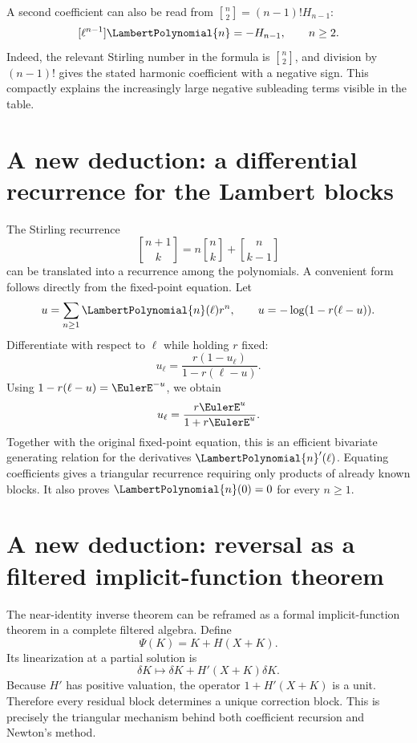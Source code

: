 \documentclass[11pt,openany]{book}
\theoremstyle{definition}
\theoremstyle{plain}
\theoremstyle{remark}
\newcommand{\stirlingone}[2]{\genfrac{[}{]}{0pt}{}{#1}{#2}}
\begin{document}
A second coefficient can also be read from \(\stirlingone{n}{2}=(n-1)!H_{n-1}\):
\begin{equation}\label{eq:Pn-next-leading}
 [\ell^{n-1}]\LambertPolynomial{n}
 =-H_{n-1},
 \qquad n\ge2.
\end{equation}
Indeed, the relevant Stirling number in the formula is \(\stirlingone{n}{2}\), and division by \((n-1)!\) gives the stated harmonic coefficient with a negative sign. This compactly explains the increasingly large negative subleading terms visible in the table.

\section{A new deduction: a differential recurrence for the Lambert blocks}
The Stirling recurrence
\[
 \stirlingone{n+1}{k}=n\stirlingone{n}{k}+\stirlingone{n}{k-1}
\]
can be translated into a recurrence among the polynomials. A convenient form follows directly from the fixed-point equation. Let
\[
 u=\sum_{n\ge1}\LambertPolynomial{n}(\ell)r^n,
 \qquad
 u=-\log(1-r(\ell-u)).
\]
Differentiate with respect to \(\ell\) while holding \(r\) fixed:
\[
 u_\ell=\frac{r(1-u_\ell)}{1-r(\ell-u)}.
\]
Using \(1-r(\ell-u)=\EulerE^{-u}\), we obtain
\begin{equation}\label{eq:Lambert-generating-differential}
 u_\ell=\frac{r\EulerE^u}{1+r\EulerE^u}.
\end{equation}
Together with the original fixed-point equation, this is an efficient bivariate generating relation for the derivatives \({\LambertPolynomial{n}}'(\ell)\). Equating coefficients gives a triangular recurrence requiring only products of already known blocks. It also proves \(\LambertPolynomial{n}(0)=0\) for every \(n\ge1\).

\section{A new deduction: reversal as a filtered implicit-function theorem}
The near-identity inverse theorem can be reframed as a formal implicit-function theorem in a complete filtered algebra. Define
\[
 \Psi(K)=K+H(X+K).
\]
Its linearization at a partial solution is
\[
 \delta K\longmapsto \delta K+H'(X+K)\delta K.
\]
Because \(H'\) has positive valuation, the operator \(1+H'(X+K)\) is a unit. Therefore every residual block determines a unique correction block. This is precisely the triangular mechanism behind both coefficient recursion and Newton's method.
\end{document}
